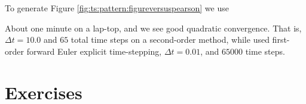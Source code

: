 To generate Figure \ref{fig:ts:pattern:figureversuspearson} we use
About one minute on a lap-top, and we see good quadratic convergence.  That is, $\Delta t=10.0$ and $65$ total time steps on a second-order method, while \citep{Pearson1993} used first-order forward Euler explicit time-stepping, $\Delta t = 0.01$, and $65000$ time steps.


\section{Exercises}

\renewcommand{\labelenumi}{\arabic{chapter}.\arabic{enumi}\quad}
\renewcommand{\labelenumii}{(\alph{enumii})}
